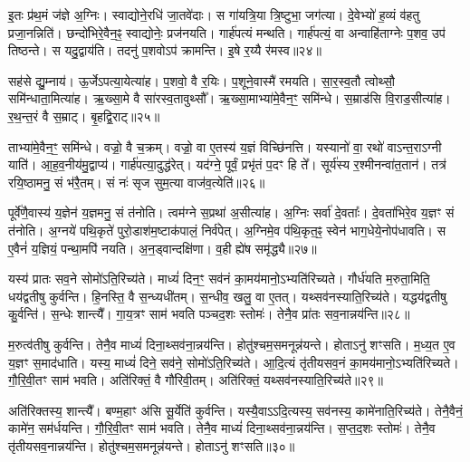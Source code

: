 इ॒तः प्र॑थ॒मं ज॑ज्ञे अ॒ग्निः।
स्वाद्योने॒रधि॑ जा॒तवे॑दाः।
स गा॑यत्रि॒या त्रि॒ष्टुभा॒ जग॑त्या।
दे॒वेभ्यो॑ ह॒व्यं व॑हतु प्रजा॒नन्निति॑।
छन्दो॑भिरे॒वैन॒ꣴ॒ स्वाद्योनेः॒ प्रज॑नयति।
गार्\mbox{}ह॑पत्यं मन्थति।
गार्\mbox{}ह॑पत्यं॒ वा अन्वाहि॑ताग्नेः प॒शव॒ उप॑ तिष्ठन्ते।
स यदु॒द्वाय॑ति।
तदनु॑ प॒शवोऽप॑ क्रामन्ति।
इ॒षे र॒य्यै र॑मस्व॥२४॥\ip

सह॑से द्यु॒म्नाय॑।
ऊ॒र्जे\-ऽपत्या॒येत्या॑ह।
प॒शवो॒ वै र॒यिः।
प॒शूने॒वास्मै॑ रमयति।
सा॒र॒स्व॒तौ त्वोथ्सौ॒ समि॑न्धाता॒मित्या॑ह।
ऋ॒ख्सा॒मे वै सा॑रस्व॒तावुथ्सौ᳚।
ऋ॒ख्सा॒माभ्या॑मे॒वैन॒ꣳ॒ समि॑न्धे।
स॒म्राड॑सि वि॒राड॒सीत्या॑ह।
र॒थ॒न्त॒रं वै स॒म्राट्।
बृ॒हद्वि॒राट्॥२५॥\ip

ताभ्या॑मे॒वैन॒ꣳ॒ समि॑न्धे।
वज्रो॒ वै च॒क्रम्।
वज्रो॒ वा ए॒तस्य॑ य॒ज्ञं विच्छि॑नत्ति।
यस्यानो॑ वा॒ रथो॑ वाऽन्त॒रा\-ऽग्नी याति॑।
आ॒ह॒व॒नीय॑मु॒द्वाप्य॑।
गार्\mbox{}ह॑पत्या॒दुद्ध॑रेत्।
यद॑ग्ने॒ पूर्वं॒ प्रभृ॑तं प॒दꣳ हि ते᳚।
सूर्य॑स्य र॒श्मीनन्वा॑त॒तान॑।
तत्र॑ रयि॒ष्ठामनु॒ सं भ॑रै॒तम्।
सं नः॑ सृज सुम॒त्या वाज॑व॒त्येति॑॥२६॥\ip

पूर्वे॑णै॒वास्य॑ य॒ज्ञेन॑ य॒ज्ञमनु॒ सं त॑नोति।
त्वम॑ग्ने स॒प्रथा॑ अ॒सीत्या॑ह।
अ॒ग्निः सर्वा॑ दे॒वताः᳚।
दे॒वता॑भिरे॒व य॒ज्ञꣳ सं त॑नोति।
अ॒ग्नये॑ पथि॒कृते॑ पुरो॒डाश॑म॒ष्टा\-क॑पालं॒ निर्व॑पेत्।
अ॒ग्निमे॒व प॑थि॒कृत॒ꣴ॒ स्वेन॑ भाग॒धेये॒नोप॑धावति।
स ए॒वैनं॑ य॒ज्ञियं॒ पन्था॒मपि॑ नयति।
अ॒न॒ड्वान्दक्षि॑णा।
व॒ही ह्ये॑ष समृ॑द्ध्यै॥२७॥\ip{}

यस्य॑ प्रातः सव॒ने सोमो॑\-ऽति॒\-रिच्य॑ते।
माध्यं॑ दिन॒ꣳ॒ सव॑नं का॒मय॑मानो॒\-ऽभ्यति॑रिच्यते।
गौर्ध॑यति म॒रुता॒मिति॒ धय॑द्वतीषु कुर्वन्ति।
हि॒नस्ति॒ वै स॒न्ध्यधी॑तम्।
स॒न्धीव॒ खलु॒ वा ए॒तत्।
यथ्सव॑नस्याति॒\-रिच्य॑ते।
यद्धय॑द्वतीषु कु॒र्वन्ति॑।
स॒न्धेः शान्त्यै᳚।
गा॒य॒त्रꣳ साम॑ भवति पञ्चद॒शः स्तोमः॑।
तेनै॒व प्रा॑तः सव॒नान्नय॑न्ति॥२८॥\ip

म॒रुत्व॑तीषु कुर्वन्ति।
तेनै॒व माध्यं॑ दिना॒थ्सव॑ना॒न्नय॑न्ति।
होतु॑श्चम॒समनून्न॑यन्ते।
होताऽनु॑ शꣳसति।
म॒ध्य॒त ए॒व य॒ज्ञꣳ स॒माद॑धाति।
यस्य॒ माध्यं॑ दिने॒ सव॑ने॒ सोमो॑\-ऽति॒\-रिच्य॑ते।
आ॒दि॒त्यं तृ॑तीयसव॒नं का॒मय॑मानो॒\-ऽभ्यति॑रिच्यते।
गौ॒रि॒वी॒तꣳ साम॑ भवति।
अति॑रिक्तं॒ वै गौ॑रिवी॒तम्।
अति॑रिक्तं॒ यथ्सव॑नस्याति॒\-रिच्य॑ते॥२९॥\ip

अति॑रिक्तस्य॒ शान्त्यै᳚।
बण्म॒हाꣳ अ॑सि सू॒र्येति॑ कुर्वन्ति।
यस्यै॒वा\-ऽऽदि॒त्यस्य॒ सव॑नस्य॒ कामे॑नाति॒\-रिच्य॑ते।
तेनै॒वैनं॒ कामे॑न॒ सम॑र्धयन्ति।
गौ॒रि॒वी॒तꣳ साम॑ भवति।
तेनै॒व माध्यं॑ दिना॒थ्सव॑ना॒न्नय॑न्ति।
स॒प्त॒द॒शः स्तोमः॑।
तेनै॒व तृ॑तीयसव॒नान्नय॑न्ति।
होतु॑श्चम॒समनून्न॑यन्ते।
होताऽनु॑ शꣳसति॥३०॥\ip

